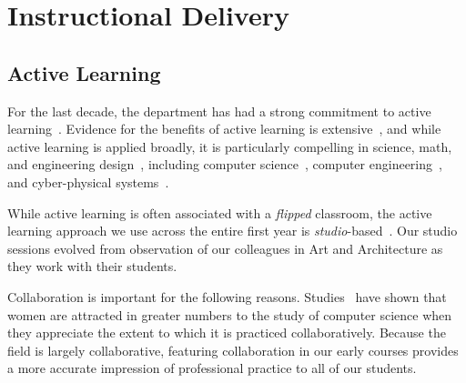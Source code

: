 \section{Instructional Delivery}
\label{sec:delivery}

\subsection{Active Learning}

For the last decade, the department has had a strong commitment to
active learning~\cite{scbggg10}.
Evidence for the benefits of active learning is
extensive~\cite{Prince04}, %
and while active learning is applied broadly, it is particularly
compelling in science, math, and engineering
design~\cite{Freeman14},  %
including computer science~\cite{ag13}, %
computer engineering~\cite{sr02}, %
and cyber-physical systems~\cite{me14}. %

While active learning is often associated with a \emph{flipped} classroom, %
the active learning approach we use across the entire
first year is \emph{studio}-based~\cite{hnc08}.
Our studio sessions evolved from observation of our colleagues in
Art and Architecture as they work with their students.

Collaboration is important for the following reasons.
Studies~\cite{Krause:2012:EFL:2157136.2157192} have shown that women are
attracted in greater numbers to the study of computer science when they
appreciate the extent to which it is practiced collaboratively.  Because
the field is largely collaborative,
featuring collaboration
in our early courses provides a more accurate impression of professional
practice to all of our students. 

